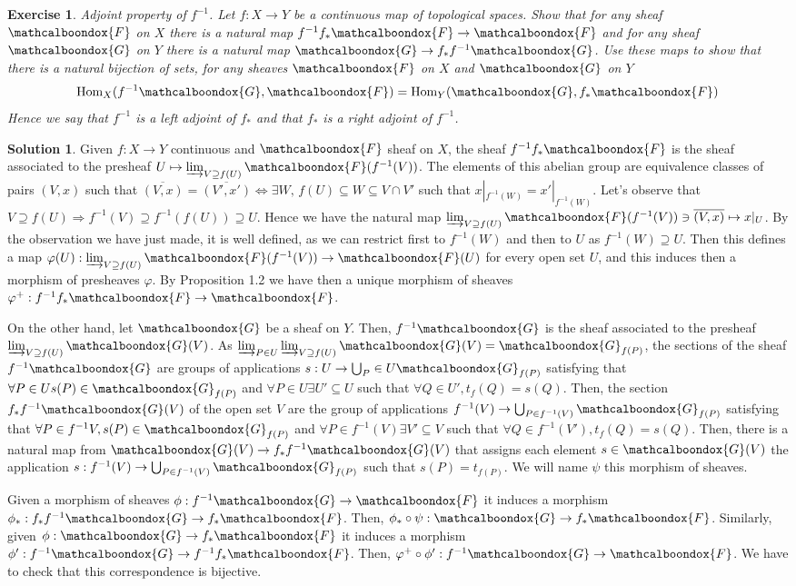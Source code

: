 \documentclass[12pt]{article}
\newcommand{\imp}{\ensuremath{\Rightarrow}}
\newtheorem{ex}{Exercise}[section]
\theoremstyle{definition}
\newtheorem*{sol}{Solution}
\newcommand{\sF}{\ensuremath{\mathcalboondox{F}}}
\newcommand{\sG}{\ensuremath{\mathcalboondox{G}}}
\begin{document}
\begin{ex}
	Adjoint property of $f^{-1}$. Let $f: X \to Y$ be a continuous map of topological spaces. Show that for any sheaf $\sF$ on $X$ there is a natural map $f^{-1}f_{*}\sF \to \sF$ and for any sheaf $\sG$ on $Y$ there is a natural map $\sG \to f_{*}f^{-1}\sG$. Use these maps to show that there is a natural bijection of sets, for any sheaves $\sF$ on $X$ and $\sG$ on $Y$
	\[
		\mathrm{Hom}_X(f^{-1}\sG, \sF) = \mathrm{Hom}_Y(\sG, f_{*}\sF)
	\]
	Hence we say that $f^{-1}$ is a left adjoint of $f_{*}$ and that $f_{*}$ is a right adjoint of $f^{-1}$.
\end{ex}

\begin{sol}
	Given $f:X \to Y$ continuous and $\sF$ sheaf on $X$, the sheaf $f^{-1}f_{*}\sF$ is the sheaf associated to the presheaf $U \mapsto \varinjlim_{V \supseteq f(U)} \sF(f^{-1}(V))$. The elements of this abelian group are equivalence classes of pairs $(V,x)$ such that $\overline{(V,x)} = \overline{(V',x')} \iff \exists W, \, f(U) \subseteq W \subseteq V \cap V'$ such that $x|_{f^{-1}(W)} = x'|_{f^{-1}(W)}$. Let's observe that $V \supseteq f(U) \imp f^{-1}(V) \supseteq f^{-1}(f(U)) \supseteq U$. Hence we have the natural map $\varinjlim_{V \supseteq f(U)} \sF(f^{-1}(V)) \ni \overline{(V,x)} \mapsto x|_U$. By the observation we have just made, it is well defined, as we can restrict first to $f^{-1}(W)$ and then to $U$ as $f^{-1}(W) \supseteq U$. Then this defines a map $\varphi(U): \varinjlim_{V \supseteq f(U)} \sF(f^{-1}(V)) \to \sF(U)$ for every open set $U$, and this induces then a morphism of presheaves $\varphi$. By Proposition 1.2 we have then a unique morphism of sheaves $\varphi^{+}: f^{-1}f_{*}\sF \to \sF$.

	On the other hand, let $\sG$ be a sheaf on $Y$. Then, $f^{-1}\sG$ is the sheaf associated to the presheaf $\varinjlim_{V \supseteq f(U)} \sG(V)$. As $\varinjlim_{P \in U} \varinjlim_{V \supseteq f(U)} \sG(V) = \sG_{f(P)}$, the sections of the sheaf $f^{-1}\sG$ are groups of applications $s: U \to \bigcup_P \in U \sG_{f(P)}$ satisfying that $\forall P \in U s(P) \in \sG_{f(P)}$ and $\forall P \in U \exists U' \subseteq U$ such that $\forall Q \in U', t_f(Q) = s(Q)$. Then, the section $f_{*}f^{-1}\sG(V)$  of the open set $V$ are the group of applications $f^{-1}(V) \to \bigcup_{P \in f^{-1}(V)} \sG_{f(P)}$ satisfying that $\forall P \in f^{-1}V, s(P) \in \sG_{f(P)}$ and $\forall P \in f^{-1}(V) \exists V' \subseteq V$ such that $\forall Q \in f^{-1}(V'), t_f(Q) = s(Q)$. Then, there is a natural map from $\sG(V) \to f_{*}f^{-1}\sG(V)$ that assigns each element $s \in \sG(V)$ the application $s: f^{-1}(V) \to \bigcup_{P \in f^{-1}(V)} \sG_{f(P)}$ such that $s(P) = t_{f(P)}$. We will name $\psi$ this morphism of sheaves.

	Given a morphism of sheaves $\phi: f^{-1}\sG \to \sF$ it induces a morphism $\phi_{*}: f_{*}f^{-1}\sG \to f_{*}\sF$. Then, $\phi_{*} \circ \psi: \sG \to f_{*}\sF$. Similarly, given $\phi: \sG \to f_{*}\sF$ it induces a morphism $\phi': f^{-1}\sG \to f^{-1}f_{*}\sF$. Then, $\varphi^{+} \circ \phi': f^{-1}\sG \to \sF$. We have to check that this correspondence is bijective. 
\end{sol}
\end{document}
